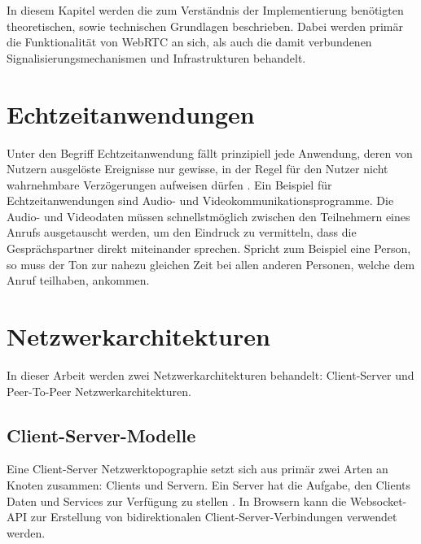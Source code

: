 In diesem Kapitel werden die zum Verständnis der Implementierung benötigten theoretischen, sowie technischen Grundlagen beschrieben. Dabei werden primär die Funktionalität von \acs{WebRTC} an sich, als auch die damit verbundenen Signalisierungsmechanismen und Infrastrukturen behandelt.

\section{Echtzeitanwendungen}
Unter den Begriff \glqq{}Echtzeitanwendung\grqq{} fällt prinzipiell jede Anwendung, deren von Nutzern ausgelöste Ereignisse nur gewisse, in der Regel für den Nutzer nicht wahrnehmbare Verzögerungen aufweisen dürfen \cite{realtimeapp}. Ein Beispiel für Echtzeitanwendungen sind Audio- und Videokommunikationsprogramme. Die Audio- und Videodaten müssen schnellstmöglich zwischen den Teilnehmern eines Anrufs ausgetauscht werden, um den Eindruck zu vermitteln, dass die Gesprächspartner direkt miteinander sprechen. Spricht zum Beispiel eine Person, so muss der Ton zur nahezu gleichen Zeit bei allen anderen Personen, welche dem Anruf teilhaben, ankommen.

\section{Netzwerkarchitekturen}
In dieser Arbeit werden zwei Netzwerkarchitekturen behandelt: Client-Server und Peer-To-Peer Netzwerkarchitekturen.

\subsection{Client-Server-Modelle}
Eine Client-Server Netzwerktopographie setzt sich aus primär zwei Arten an Knoten zusammen: Clients und Servern. Ein Server hat die Aufgabe, den Clients Daten und Services zur Verfügung zu stellen \cite{silveira2015}. In Browsern kann die Websocket-API zur Erstellung von bidirektionalen Client-Server-Verbindungen verwendet werden.\par


